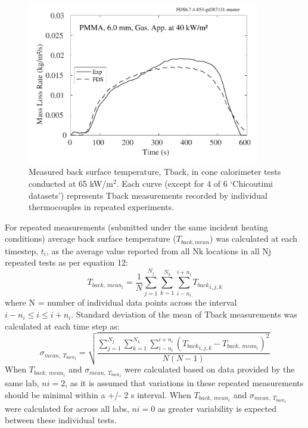 \documentclass{book}
\begin{document}
\begin{figure}
  \centering
  \includegraphics[width=4in]{SCRIPT_FIGURES/PMMA_40}
  \caption{Measured back surface temperature, Tback, in cone calorimeter tests conducted at 65 kW/m$^2$. Each curve (except for 4 of 6 ‘Chicoutimi datasets’) represents Tback measurements recorded by individual thermocouples in repeated experiments.}
  \label{Fig_21}
\end{figure}


For repeated measurements (submitted under the same incident heating conditions) average back surface temperature ($T_{back,mean}$) was calculated at each timestep, $t_i$, as the average value reported from all Nk locations in all Nj repeated tests as per equation 12:
\begin{equation}
   T_{back,\ mean_i}=\frac{1}{N}\sum_{j=1}^{N_j}\sum_{k=1}^{N_k}\sum_{i-n_i}^{i+n_i}{T_{back}}_{i,j,k}
\end{equation}
where N = number of individual data points across the interval $i-n_i\le i\le i+n_i$. Standard deviation of the mean of Tback measurements was calculated at each time step as:
\begin{equation}
   \sigma_{mean,\ {T_{back}}_i}=\sqrt{\frac{\sum_{j=1}^{N_j}\sum_{k=1}^{N_k}\sum_{i-n_i}^{i+n_i}\left({T_{back}}_{i,j,k}-T_{back,\ mean_i}\right)^2}{N\left(N-1\right)}}
\end{equation}
When $T_{back,\ mean_i}$ and $\sigma_{mean,\ {T_{back}}_i}$ were calculated based on data provided by the same lab, $ni =2$, as it is assumed that variations in these repeated measurements should be minimal within a +/- 2 s interval. When $T_{back,\ mean_i}$ and $\sigma_{mean,\ {T_{back}}_i}$ were calculated for across all labs, $ni=0$ as greater variability is expected between these individual tests.
\end{document}
